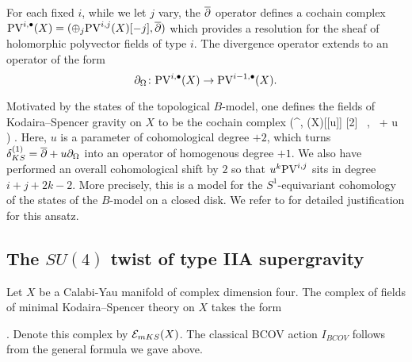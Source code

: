 For each fixed $i$, while we let $j$ vary, the $\overline{\partial}$ operator defines a cochain complex ${\rm PV}^{i,\bullet}(X) = (\oplus_j{\rm PV}^{i,j}(X) [-j], \overline{\partial})$ which provides a resolution for the sheaf of holomorphic polyvector fields of type $i$. 
The divergence operator extends to an operator of the form
\[
\partial_{\Omega} \colon {\rm PV}^{i,\bullet}(X) \to {\rm PV}^{i-1,\bullet}(X) .
\]

Motivated by the states of the topological $B$-model, one defines the fields of Kodaira--Spencer gravity on $X$ to be the cochain complex
\beqn\label{eqn:ks1}
\left(\PV^{\bu,\bu} (X)[[u]] [2] \, , \, \dbar + u \div\right) .
\eeqn 
Here, $u$ is a parameter of cohomological degree $+2$, which turns $\delta_{KS}^{(1)} = \overline{\partial} + u \partial_{\Omega}$ into an operator of homogenous degree $+1$. 
We also have performed an overall cohomological shift by $2$ so that $u^k {\rm PV}^{i,j}$ sits in degree $i+j+2k-2$. 
More precisely, this is a model for the $S^1$-equivariant cohomology of the states of the $B$-model on a closed disk. 
We refer to \cite{CLtypeI, CLsugra} for detailed justification for this ansatz. 


\parsec[s:poisson]


\parsec[s:ksaction] 


\parsec[s:minimalks]


\subsection{The $SU(4)$ twist of type IIA supergravity}


Let $X$ be a Calabi-Yau manifold of complex dimension four. 
The complex of fields of minimal Kodaira--Spencer theory on $X$ takes the form
\beqn
{}.
\eeqn
Denote this complex by $\mathcal E_{mKS}(X)$. 
The classical BCOV action $I_{BCOV}$ follows from the general formula we gave above. 

